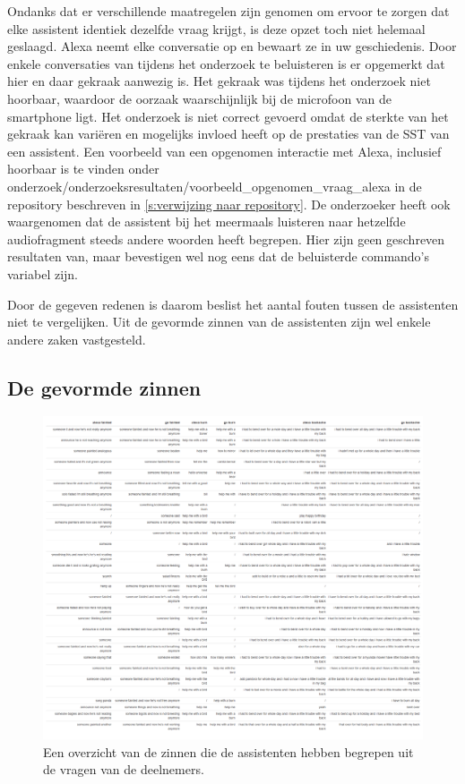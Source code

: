 Ondanks dat er verschillende maatregelen zijn genomen om ervoor te zorgen dat elke assistent identiek dezelfde vraag krijgt, is deze opzet toch niet helemaal geslaagd. Alexa neemt elke conversatie op en bewaart ze in uw geschiedenis. Door enkele conversaties van tijdens het onderzoek te beluisteren is er opgemerkt dat hier en daar gekraak aanwezig is. Het gekraak was tijdens het onderzoek niet hoorbaar, waardoor de oorzaak waarschijnlijk bij de microfoon van de smartphone ligt. Het onderzoek is niet correct gevoerd omdat de sterkte van het gekraak kan variëren en mogelijks invloed heeft op de prestaties van de SST van een assistent. Een voorbeeld van een opgenomen interactie met Alexa, inclusief hoorbaar is te vinden onder onderzoek/onderzoeksresultaten/voorbeeld\_opgenomen\_vraag\_alexa in de repository beschreven in \ref{s:verwijzing naar repository}.
De onderzoeker heeft ook waargenomen dat de assistent bij het meermaals luisteren naar hetzelfde audiofragment steeds andere woorden heeft begrepen. Hier zijn geen geschreven resultaten van, maar bevestigen wel nog eens dat de beluisterde commando's variabel zijn.

Door de gegeven redenen is daarom beslist het aantal fouten tussen de assistenten niet te vergelijken. Uit de gevormde zinnen van de assistenten zijn wel enkele andere zaken vastgesteld.

\subsection{De gevormde zinnen}
\begin{figure}[h]
    \includegraphics[width=1\linewidth]{../onderzoek/onderzoeksresultaten/vergelijking_tts_alle_teksten/tabel_alle_teksten}
    \caption{Een overzicht van de zinnen die de assistenten hebben begrepen uit de vragen van de deelnemers.}
    \label{fig:tabel-alle-teksten}
\end{figure}

